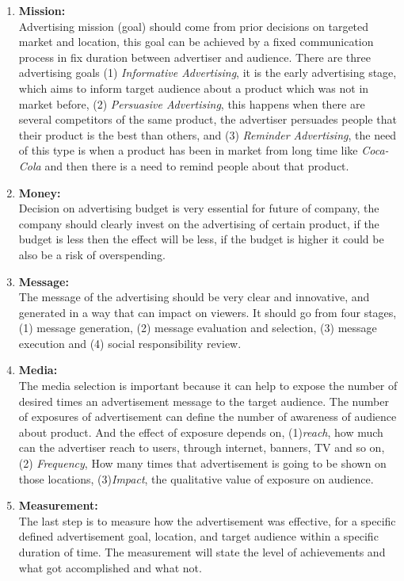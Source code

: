 \begin{enumerate}

\item \textbf{Mission:} \\
Advertising mission (goal) should come from prior decisions on targeted market and location, this goal can be achieved by a fixed communication process in fix duration between advertiser and audience. There are three advertising goals (1) \emph{Informative Advertising}, it is the early advertising stage, which aims to inform target audience about a product which was not in market before, (2) \emph{Persuasive Advertising}, this happens when there are several competitors of the same product, the advertiser persuades people that their product is the best than others, and (3) \emph{Reminder Advertising}, the need of this type is when a product has been in market from long time like \emph{Coca-Cola} and then there is a need to remind people about that product.

\item \textbf{Money:} \\
Decision on advertising budget is very essential for future of company, the company should clearly invest on the advertising of certain product, if the budget is less then the effect will be less, if the budget is higher it could be also be a risk of overspending.

\item \textbf{Message:} \\
The message of the advertising should be very clear and innovative, and generated in a way that can impact on viewers. It should go from four stages, (1) message generation, (2) message evaluation and selection, (3) message execution and (4) social responsibility review.

\item \textbf{Media:} \\
The media selection is important because it can help to expose the number of desired times an advertisement message to the target audience. The number of exposures of advertisement can define the number of awareness of audience about product. And the effect of exposure depends on, (1)\emph{reach}, how much can the advertiser reach to users, through internet, banners, TV and so on, (2) \emph{Frequency}, How many times that advertisement is going to be shown on those locations, (3)\emph{Impact}, the qualitative value of exposure on audience.
\item \textbf{Measurement:} \\
The last step is to measure how the advertisement was effective, for a specific defined advertisement goal, location, and target audience within a specific duration of time. The measurement will state the level of achievements and what got accomplished and what not.
\end{enumerate}


